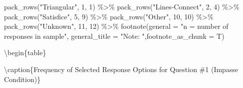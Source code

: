 \documentclass[
  letterpaper,
  DIV=11,
  numbers=noendperiod]{scrreprt}
\newenvironment{Shaded}{\begin{snugshade}}{\end{snugshade}}
\newcommand{\AttributeTok}[1]{\textcolor[rgb]{0.40,0.45,0.13}{#1}}
\newcommand{\DecValTok}[1]{\textcolor[rgb]{0.68,0.00,0.00}{#1}}
\newcommand{\FunctionTok}[1]{\textcolor[rgb]{0.28,0.35,0.67}{#1}}
\newcommand{\NormalTok}[1]{\textcolor[rgb]{0.00,0.23,0.31}{#1}}
\newcommand{\SpecialCharTok}[1]{\textcolor[rgb]{0.37,0.37,0.37}{#1}}
\newcommand{\StringTok}[1]{\textcolor[rgb]{0.13,0.47,0.30}{#1}}
\begin{document}
\begin{Shaded}
\begin{Highlighting}[]
  \FunctionTok{pack\_rows}\NormalTok{(}\StringTok{"Triangular"}\NormalTok{, }\DecValTok{1}\NormalTok{, }\DecValTok{1}\NormalTok{) }\SpecialCharTok{\%\textgreater{}\%} 
  \FunctionTok{pack\_rows}\NormalTok{(}\StringTok{"Lines{-}Connect"}\NormalTok{, }\DecValTok{2}\NormalTok{, }\DecValTok{4}\NormalTok{) }\SpecialCharTok{\%\textgreater{}\%} 
  \FunctionTok{pack\_rows}\NormalTok{(}\StringTok{"Satisfice"}\NormalTok{, }\DecValTok{5}\NormalTok{, }\DecValTok{9}\NormalTok{) }\SpecialCharTok{\%\textgreater{}\%} 
  \FunctionTok{pack\_rows}\NormalTok{(}\StringTok{"Other"}\NormalTok{, }\DecValTok{10}\NormalTok{, }\DecValTok{10}\NormalTok{) }\SpecialCharTok{\%\textgreater{}\%} 
  \FunctionTok{pack\_rows}\NormalTok{(}\StringTok{"Unknown"}\NormalTok{, }\DecValTok{11}\NormalTok{, }\DecValTok{12}\NormalTok{) }\SpecialCharTok{\%\textgreater{}\%} 
  \FunctionTok{footnote}\NormalTok{(}\AttributeTok{general =} \StringTok{"n = number of responses in sample"}\NormalTok{, }
           \AttributeTok{general\_title =} \StringTok{"Note: "}\NormalTok{,}\AttributeTok{footnote\_as\_chunk =}\NormalTok{ T) }
\end{Highlighting}
\end{Shaded}

\textbackslash begin\{table\}

\textbackslash caption\{\label{tab:Q1-IMPASSE-RESPONSES}Frequency of
Selected Response Options for Question \#1 (Impasse Condition)\}
\centering
\end{document}
